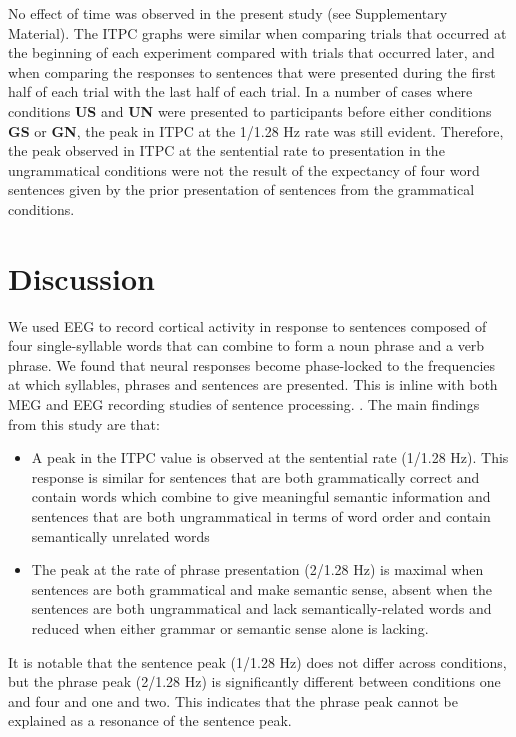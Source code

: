 \documentclass[a4paper,10pt,twoside]{article}
\begin{document}
No effect of time was observed in the present study (see Supplementary Material). The ITPC graphs were similar when comparing trials that occurred at the beginning of each experiment compared with trials that occurred later, and when comparing the responses to sentences that were presented during the first half of each trial with the last half of each trial. In a number of cases where conditions \textbf{US} and \textbf{UN} were presented to participants before either conditions \textbf{GS} or \textbf{GN}, the peak in ITPC at the 1/1.28 Hz rate was still evident. Therefore, the peak observed in ITPC at the sentential rate to presentation in the ungrammatical conditions were not the result of the expectancy of four word sentences given by the prior presentation of sentences from the grammatical conditions. 







\section*{Discussion}


We used EEG to record cortical activity in response to sentences
composed of four single-syllable words that can combine to form a noun
phrase and a verb phrase. We found that neural responses become
phase-locked to the frequencies at which syllables, phrases and
sentences are presented. This is inline with both MEG and EEG
recording studies of sentence processing.
\cite{DingEtAl2015,DingEtAl2017}. The main findings from this study
are that:
\begin{itemize}
\item A peak in the ITPC value is observed at the sentential rate
  (1/1.28 Hz). This response is similar for sentences that are both
  grammatically correct and contain words which combine to give
  meaningful semantic information and sentences that are both
  ungrammatical in terms of word order and contain semantically
  unrelated words
\item The peak at the rate of phrase presentation
  (2/1.28 Hz) is maximal when sentences are both grammatical and make
  semantic sense, absent when the sentences are both ungrammatical and
  lack semantically-related words and reduced when either grammar or
  semantic sense alone is lacking. 
\end{itemize}
%
% 
%
It is notable that the sentence peak (1/1.28 Hz) does not differ
across conditions, but the phrase peak (2/1.28 Hz) is significantly
different between conditions one and four and one and two. This indicates that the
phrase peak cannot be explained as a resonance of the sentence peak.
\end{document}
